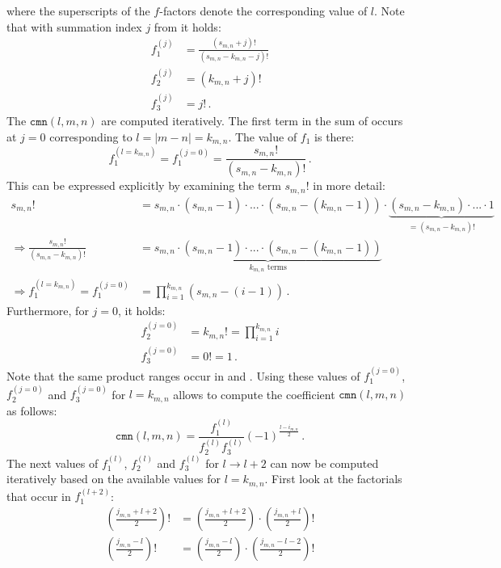 where the superscripts of the $f$-factors denote the corresponding value of $l$.
Note that with summation index $j$ from  it holds:
\begin{align}
 f_1^{(j)} &= \frac{\left(s_{m,n}         + j \right)!}
                   {\left(s_{m,n}-k_{m,n} - j \right)!} \\
 f_2^{(j)} &= (k_{m,n}+j)! \\
 f_3^{(j)} &= j! \, .
\end{align}
The $\mathtt{cmn}(l,m,n)$ are computed iteratively.
The first term in the sum of  occurs at $j=0$ corresponding to $l=|m-n|=k_{m,n}$.
The value of $f_1$ is there:
\begin{equation}
   f_1^{(l=k_{m,n})} = f_1^{(j=0)}
 = \frac{      s_{m,n}                !}
        {\left(s_{m,n}-k_{m,n} \right)!} \, .
\end{equation}
This can be expressed explicitly by examining the term $s_{m,n}!$ in more detail:
\begin{align}
 s_{m,n}! &= s_{m,n} \cdot (s_{m,n}-1) \cdot ... \cdot (s_{m,n}-(k_{m,n}-1))
  \cdot \underbrace{(s_{m,n}-k_{m,n}) \cdot ... \cdot 1}_{=(s_{m,n}-k_{m,n})!} \nonumber \\
\Rightarrow
 \frac{s_{m,n}!}{(s_{m,n}-k_{m,n})!} &=
   \underbrace{s_{m,n} \cdot (s_{m,n}-1) \cdot ... \cdot (s_{m,n}-(k_{m,n}-1))}_{k_{m,n} \textrm{ terms}} \nonumber \\
\Rightarrow
 f_1^{(l=k_{m,n})} = f_1^{(j=0)} &= \prod_{i=1}^{k_{m,n}} (s_{m,n} - (i-1)) \, . \label{eqn:f_1_start}
\end{align}
Furthermore, for $j=0$, it holds:
\begin{align}
 f_2^{(j=0)} &= k_{m,n}! = \prod_{i=1}^{k_{m,n}} i \label{eqn:f_2_start} \\
 f_3^{(j=0)} &= 0! = 1 \, . \label{eqn:f_3_start}
\end{align}
Note that the same product ranges occur in  and .
Using these values of $f_1^{(j=0)}$, $f_2^{(j=0)}$ and $f_3^{(j=0)}$ for $l=k_{m,n}$
allows to compute the coefficient $\mathtt{cmn}(l,m,n)$ as follows:
\begin{equation}
 \mathtt{cmn}(l,m,n) = \frac{f_1^{(l)}}{f_2^{(l)} f_3^{(l)}} (-1)^{\frac{l-i_{m,n}}{2}} \, .
\end{equation}
The next values of $f_1^{(l)}$, $f_2^{(l)}$ and $f_3^{(l)}$ for $l \rightarrow l+2$ can now be computed
iteratively based on the available values for $l=k_{m,n}$.
First look at the factorials that occur in $f_1^{(l+2)}$:
\begin{align}
 \left( \frac{j_{m,n}+l+2}{2} \right)! &= \left( \frac{j_{m,n}+l+2}{2} \right) \cdot \left( \frac{j_{m,n}+l  }{2} \right)! \nonumber \\
 \left( \frac{j_{m,n}-l  }{2} \right)! &= \left( \frac{j_{m,n}-l  }{2} \right) \cdot \left( \frac{j_{m,n}-l-2}{2} \right)! \nonumber
\end{align}
